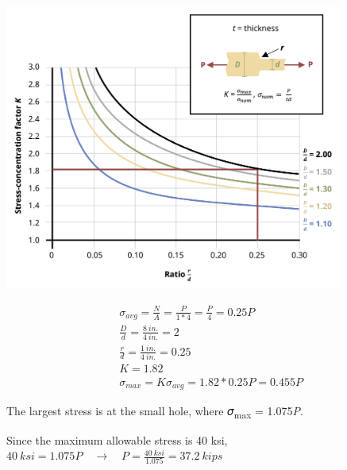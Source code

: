 \documentclass[
  letterpaper,
  DIV=11,
  numbers=noendperiod]{scrreprt}
\theoremstyle{definition}
\theoremstyle{remark}
\begin{document}
\begin{tcolorbox}
\begin{tcolorbox}
\begin{center}
\includegraphics[width=4.38542in,height=\textheight]{images/PNGs/Example 5.2 part 4.png}
\end{center}

\[
\begin{aligned}
& \sigma_{avg}=\frac{N}{A}=\frac{P}{1 * 4}=\frac{P}{4}=0.25 P \\
& \frac{D}{d}=\frac{8{~in.}}{4{~in.}}=2 \\
& \frac{r}{d}=\frac{1{~in.}}{4{~in.}}=0.25 \\
& K=1.82 \\
& \sigma_{max}=K \sigma_{avg}=1.82 * 0.25 P=0.455 P
\end{aligned}
\]

The largest stress is at the small hole, where 𝜎\textsubscript{max} =
1.075\emph{P}.

Since the maximum allowable stress is 40 ksi,
\(40{~ksi}=1.075 P \quad\rightarrow\quad P=\frac{40{~ksi}}{1.075}=37.2{~kips}\)

\end{tcolorbox}

\end{tcolorbox}
\end{document}
